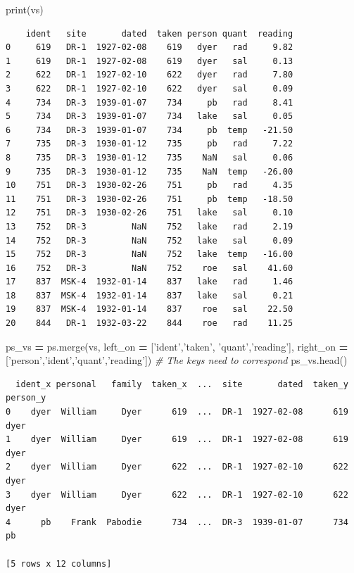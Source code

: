 \documentclass[
  letterpaper,
]{scrbook}
\newenvironment{Shaded}{\begin{snugshade}}{\end{snugshade}}
\newcommand{\BuiltInTok}[1]{#1}
\newcommand{\CommentTok}[1]{\textcolor[rgb]{0.56,0.35,0.01}{\textit{#1}}}
\newcommand{\NormalTok}[1]{#1}
\newcommand{\OperatorTok}[1]{\textcolor[rgb]{0.81,0.36,0.00}{\textbf{#1}}}
\newcommand{\StringTok}[1]{\textcolor[rgb]{0.31,0.60,0.02}{#1}}
\begin{document}
\begin{Shaded}
\begin{Highlighting}[]
\BuiltInTok{print}\NormalTok{(vs)}
\end{Highlighting}
\end{Shaded}

\begin{verbatim}
    ident   site       dated  taken person quant  reading
0     619   DR-1  1927-02-08    619   dyer   rad     9.82
1     619   DR-1  1927-02-08    619   dyer   sal     0.13
2     622   DR-1  1927-02-10    622   dyer   rad     7.80
3     622   DR-1  1927-02-10    622   dyer   sal     0.09
4     734   DR-3  1939-01-07    734     pb   rad     8.41
5     734   DR-3  1939-01-07    734   lake   sal     0.05
6     734   DR-3  1939-01-07    734     pb  temp   -21.50
7     735   DR-3  1930-01-12    735     pb   rad     7.22
8     735   DR-3  1930-01-12    735    NaN   sal     0.06
9     735   DR-3  1930-01-12    735    NaN  temp   -26.00
10    751   DR-3  1930-02-26    751     pb   rad     4.35
11    751   DR-3  1930-02-26    751     pb  temp   -18.50
12    751   DR-3  1930-02-26    751   lake   sal     0.10
13    752   DR-3         NaN    752   lake   rad     2.19
14    752   DR-3         NaN    752   lake   sal     0.09
15    752   DR-3         NaN    752   lake  temp   -16.00
16    752   DR-3         NaN    752    roe   sal    41.60
17    837  MSK-4  1932-01-14    837   lake   rad     1.46
18    837  MSK-4  1932-01-14    837   lake   sal     0.21
19    837  MSK-4  1932-01-14    837    roe   sal    22.50
20    844   DR-1  1932-03-22    844    roe   rad    11.25
\end{verbatim}

\begin{Shaded}
\begin{Highlighting}[]
\NormalTok{ps_vs }\OperatorTok{=}\NormalTok{ ps.merge(vs, }
\NormalTok{                left_on }\OperatorTok{=}\NormalTok{ [}\StringTok{'ident'}\NormalTok{,}\StringTok{'taken'}\NormalTok{, }\StringTok{'quant'}\NormalTok{,}\StringTok{'reading'}\NormalTok{],}
\NormalTok{                right_on }\OperatorTok{=}\NormalTok{ [}\StringTok{'person'}\NormalTok{,}\StringTok{'ident'}\NormalTok{,}\StringTok{'quant'}\NormalTok{,}\StringTok{'reading'}\NormalTok{]) }\CommentTok{# The keys need to correspond}
\NormalTok{ps_vs.head()}
\end{Highlighting}
\end{Shaded}

\begin{verbatim}
  ident_x personal   family  taken_x  ...  site       dated  taken_y  person_y
0    dyer  William     Dyer      619  ...  DR-1  1927-02-08      619      dyer
1    dyer  William     Dyer      619  ...  DR-1  1927-02-08      619      dyer
2    dyer  William     Dyer      622  ...  DR-1  1927-02-10      622      dyer
3    dyer  William     Dyer      622  ...  DR-1  1927-02-10      622      dyer
4      pb    Frank  Pabodie      734  ...  DR-3  1939-01-07      734        pb

[5 rows x 12 columns]
\end{verbatim}
\end{document}
